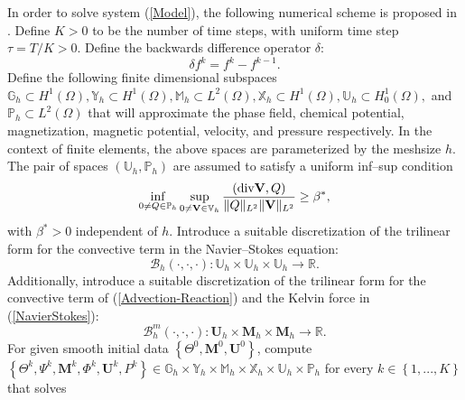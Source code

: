 \documentclass[11pt,fullpage]{article}
\newcommand{\norm}[1]{\|#1\|}
\newcommand{\Real}{\mathbb R}
\newcommand{\set}[1]{\left\{#1\right\}}
\newcommand{\diver}{\textup{div} }
\newcommand{\Ltwo}{{L^2}}
\theoremstyle{lemma}
\theoremstyle{definition}
\theoremstyle{lemma}
\begin{document}
In order to solve system (\ref{Model}), the following numerical scheme is proposed in \cite{DiffuseInterface}. Define $K>0$ to be the number of time steps, with uniform time step $\tau = T/K>0$. Define the backwards difference operator $\delta$:
$$
	\delta f^k = f^k - f^{k-1}.
$$
Define the following finite dimensional subspaces $\mathbb{G}_h\subset H^1(\Omega), \mathbb{Y}_h\subset H^1(\Omega), \mathbb{M}_h\subset L^2(\Omega), \mathbb{X}_h\subset H^1(\Omega), \mathbb{U}_h\subset H^1_0(\Omega),$ and $\mathbb{P}_h\subset L^2(\Omega)$ that will approximate the phase field, chemical potential, magnetization, magnetic potential, velocity, and pressure respectively. In the context of finite elements, the above spaces are parameterized by the meshsize $h$. The pair of spaces $(\mathbb{U}_h, \mathbb{P}_h)$ are assumed to satisfy a uniform inf--sup condition
\begin{equation}
\inf_{0\neq Q\in\mathbb{P}_h}\sup_{0\neq \mathbf{V}\in\mathbb{V}_h}\frac{(\diver \mathbf{V}, Q)}{\norm{Q}_{\Ltwo}\norm{\mathbf{V}}_\Ltwo}\geq \beta^*,
\end{equation}
with $\beta^*>0$ independent of $h$. Introduce a suitable discretization of the trilinear form for the convective term in the Navier--Stokes equation:
$$
\mathcal{B}_h(\cdot,\cdot,\cdot):\mathbb{U}_h\times\mathbb{U}_h\times\mathbb{U}_h\to\Real.
$$
Additionally, introduce a suitable discretization of the trilinear form for the convective term of (\ref{Advection-Reaction}) and the Kelvin force in (\ref{NavierStokes}):
$$
\mathcal{B}_h^m(\cdot,\cdot,\cdot):\mathbf{U}_h\times\mathbf{M}_h\times\mathbf{M}_h\to\Real.
$$
For given smooth initial data $\set{\Theta^0, \mathbf{M}^0,\mathbf{U}^0}$, compute $\set{\Theta^k, \Psi^k, \mathbf{M}^k, \Phi^k, \mathbf{U}^k, {P}^k}\in \mathbb{G}_h\times \mathbb{Y}_h\times \mathbb{M}_h\times\mathbb{X}_h\times\mathbb{U}_h\times\mathbb{P}_h$ for every $k\in\set{1,...,K}$ that solves
\end{document}
